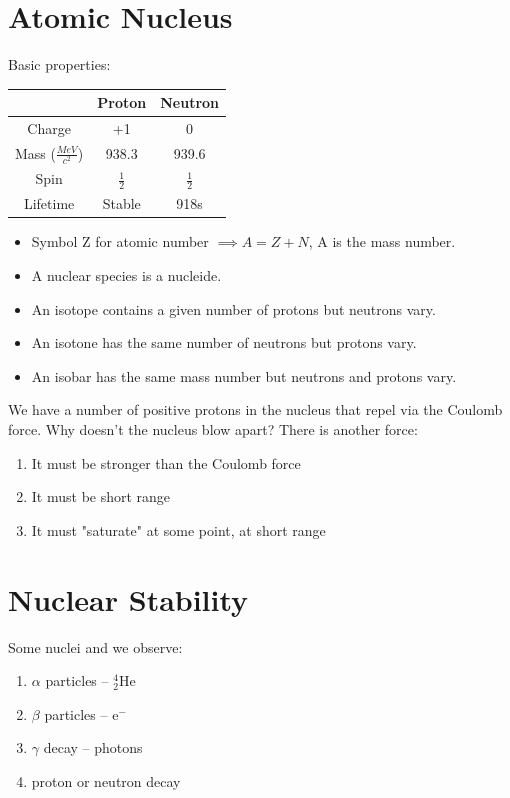 \documentclass[a4paper, 11pt, normalem]{report}
\begin{document}
\section{Atomic Nucleus}
Basic properties:
\begin{table}[H]
    \centering
    \begin{tabular}{|c|c|c|}
        \hline
        \rowcolor{lightgray} & Proton & Neutron   \\
        \hline
        Charge & +1     & 0         \\
        Mass ($\frac{MeV}{c^{2}}$)  & 938.3  & 939.6   \\
        Spin   & $\frac{1}{2}$ & $\frac{1}{2}$ \\
        Lifetime & Stable & 918s\\
        \hline
    \end{tabular}
\end{table}
\begin{itemize}
    \item Symbol Z for atomic number $\implies A = Z + N$, A is the mass number.
    \item A nuclear species is a nucleide.
    \item An isotope contains a given number of protons but neutrons vary.
    \item An isotone has the same number of neutrons but protons vary.
    \item An isobar has the same mass number but neutrons and protons vary.
\end{itemize}
We have a number of positive protons in the nucleus that repel via the Coulomb force.
Why doesn't the nucleus blow apart?
There is another force:
\begin{enumerate}
    \item It must be stronger than the Coulomb force
    \item It must be short range
    \item It must "saturate" at some point, at short range
\end{enumerate}

\section{Nuclear Stability}
Some nuclei and we observe:
\begin{enumerate}
    \item $\alpha$ particles -- $_{2}^{4}$He
    \item $\beta$ particles -- e$^{-}$
    \item $\gamma$ decay -- photons
    \item proton or neutron decay
\end{enumerate}
\end{document}
